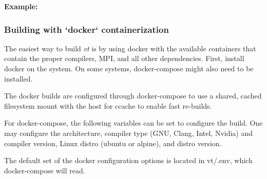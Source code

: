 {\bfseries Example\+:}


\hypertarget{vt-build_docker-build}{}\subsubsection{Building with `docker` containerization}\label{vt-build_docker-build}
The easiest way to build {\itshape vt} is by using {\ttfamily docker} with the available containers that contain the proper compilers, M\+PI, and all other dependencies. First, install {\ttfamily docker} on the system. On some systems, {\ttfamily docker-\/compose} might also need to be installed.

The {\ttfamily docker} builds are configured through {\ttfamily docker-\/compose} to use a shared, cached filesystem mount with the host for {\ttfamily ccache} to enable fast re-\/builds.

For {\ttfamily docker-\/compose}, the following variables can be set to configure the build. One may configure the architecture, compiler type (G\+NU, Clang, Intel, Nvidia) and compiler version, Linux distro (ubuntu or alpine), and distro version.

The default set of the docker configuration options is located in {\ttfamily vt/.env}, which {\ttfamily docker-\/compose} will read.



